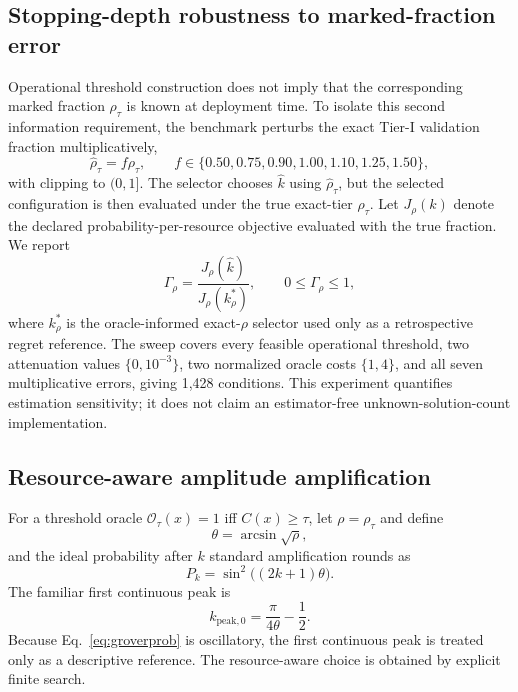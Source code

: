 \documentclass[5p,times]{elsarticle}
\begin{document}
\subsection{Stopping-depth robustness to marked-fraction error}
Operational threshold construction does not imply that the corresponding marked fraction $\rho_\tau$ is known at deployment time. To isolate this second information requirement, the benchmark perturbs the exact Tier-I validation fraction multiplicatively,
\begin{equation}
\widehat{\rho}_\tau=f\rho_\tau,
\qquad
f\in\{0.50,0.75,0.90,1.00,1.10,1.25,1.50\},
\end{equation}
with clipping to $(0,1]$. The selector chooses $\widehat{k}$ using $\widehat{\rho}_\tau$, but the selected configuration is then evaluated under the true exact-tier $\rho_\tau$. Let $J_{\rho}(k)$ denote the declared probability-per-resource objective evaluated with the true fraction. We report
\begin{equation}
\Gamma_\rho=\frac{J_{\rho}(\widehat{k})}{J_{\rho}(k^*_{\rho})},
\qquad 0\leq\Gamma_\rho\leq1,
\label{eq:rhoretention}
\end{equation}
where $k^*_{\rho}$ is the oracle-informed exact-$\rho$ selector used only as a retrospective regret reference. The sweep covers every feasible operational threshold, two attenuation values $\{0,10^{-3}\}$, two normalized oracle costs $\{1,4\}$, and all seven multiplicative errors, giving 1,428 conditions. This experiment quantifies estimation sensitivity; it does not claim an estimator-free unknown-solution-count implementation.

\subsection{Resource-aware amplitude amplification}
For a threshold oracle $\mathcal{O}_{\tau}(x)=1$ iff $C(x)\geq\tau$, let $\rho=\rho_{\tau}$ and define
\begin{equation}
\theta=\arcsin\sqrt{\rho},
\end{equation}
and the ideal probability after $k$ standard amplification rounds as
\begin{equation}
P_k=\sin^2\big((2k+1)\theta\big).
\label{eq:groverprob}
\end{equation}
The familiar first continuous peak is
\begin{equation}
k_{\mathrm{peak},0}=\frac{\pi}{4\theta}-\frac12.
\end{equation}
Because Eq.~\eqref{eq:groverprob} is oscillatory, the first continuous peak is treated only as a descriptive reference. The resource-aware choice is obtained by explicit finite search.
\end{document}
